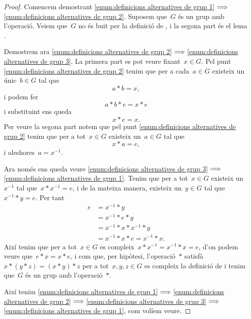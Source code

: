 \documentclass[../../main.tex]{subfiles}
\begin{document}
    \begin{proof}
        Comencem demostrant \eqref{enum:definicions alternatives de grup 1}\(\implies\)\eqref{enum:definicions alternatives de grup 2}.
        Suposem que~\(G\) és un grup amb l'operació.
        Veiem que~\(G\) no és buit per la definició de , i la segona part és el lema .

        Demostrem ara \eqref{enum:definicions alternatives de grup 2}\(\implies\)\eqref{enum:definicions alternatives de grup 3}.
        La primera part es pot veure fixant~\(x\in G\).
        Pel punt \eqref{enum:definicions alternatives de grup 2} tenim que per a cada~\(a\in G\) existeix un únic~\(b\in G\) tal que
        \[
            a\ast b=x,
        \]
        i podem fer
        \[
            a\ast b\ast e=x\ast e
        \]
        i substituint ens queda
        \[
            x\ast e=x.
        \]
        Per veure la segona part notem que pel punt \eqref{enum:definicions alternatives de grup 2} tenim que per a tot~\(x\in G\) existeix un~\(a\in G\) tal que
        \[
            x\ast a=e,
        \]
        i aleshores~\(a=x^{-1}\).

        Ara només ens queda veure \eqref{enum:definicions alternatives de grup 3}\(\implies\)\eqref{enum:definicions alternatives de grup 1}.
        Tenim que per a tot~\(x\in G\) existeix un~\(x^{-1}\) tal que~\(x\ast x^{-1}=e\), i de la mateixa manera, existeix un~\(y\in G\) tal que~\(x^{-1}\ast y=e\).
        Per tant
        \begin{align*}
        e&=x^{-1}\ast y\\
        &=x^{-1}\ast e\ast y\\
        &=x^{-1}\ast x\ast x^{-1}\ast y\\
        &=x^{-1}\ast x\ast e=x^{-1}\ast x.
        \end{align*}
        Així tenim que per a tot~\(x\in G\) es compleix~\(x\ast x^{-1}=x^{-1}\ast x=e\), d'on podem veure que~\(e\ast x=x\ast e\), i com que, per hipòtesi, l'operació~\(\ast\) satisfà~\(x\ast(y\ast z)=(x\ast y)\ast z\) per a tot~\(x,y,z\in G\) es compleix la definició de  i tenim que~\(G\) és un grup amb l'operació~\(\ast\).

        Així tenim \eqref{enum:definicions alternatives de grup 1}\(\implies\)\eqref{enum:definicions alternatives de grup 2}\(\implies\)\eqref{enum:definicions alternatives de grup 3}\(\implies\)\eqref{enum:definicions alternatives de grup 1}, com volíem veure.
    \end{proof}
\end{document}
